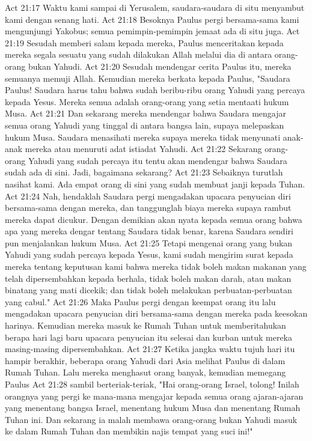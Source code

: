 Act 21:17  Waktu kami sampai di Yerusalem, saudara-saudara di situ menyambut kami dengan senang hati.
Act 21:18  Besoknya Paulus pergi bersama-sama kami mengunjungi Yakobus; semua pemimpin-pemimpin jemaat ada di situ juga.
Act 21:19  Sesudah memberi salam kepada mereka, Paulus menceritakan kepada mereka segala sesuatu yang sudah dilakukan Allah melalui dia di antara orang-orang bukan Yahudi.
Act 21:20  Sesudah mendengar cerita Paulus itu, mereka semuanya memuji Allah. Kemudian mereka berkata kepada Paulus, "Saudara Paulus! Saudara harus tahu bahwa sudah beribu-ribu orang Yahudi yang percaya kepada Yesus. Mereka semua adalah orang-orang yang setia mentaati hukum Musa.
Act 21:21  Dan sekarang mereka mendengar bahwa Saudara mengajar semua orang Yahudi yang tinggal di antara bangsa lain, supaya melepaskan hukum Musa. Saudara menasihati mereka supaya mereka tidak menyunati anak-anak mereka atau menuruti adat istiadat Yahudi.
Act 21:22  Sekarang orang-orang Yahudi yang sudah percaya itu tentu akan mendengar bahwa Saudara sudah ada di sini. Jadi, bagaimana sekarang?
Act 21:23  Sebaiknya turutlah nasihat kami. Ada empat orang di sini yang sudah membuat janji kepada Tuhan.
Act 21:24  Nah, hendaklah Saudara pergi mengadakan upacara penyucian diri bersama-sama dengan mereka, dan tanggunglah biaya mereka supaya rambut mereka dapat dicukur. Dengan demikian akan nyata kepada semua orang bahwa apa yang mereka dengar tentang Saudara tidak benar, karena Saudara sendiri pun menjalankan hukum Musa.
Act 21:25  Tetapi mengenai orang yang bukan Yahudi yang sudah percaya kepada Yesus, kami sudah mengirim surat kepada mereka tentang keputusan kami bahwa mereka tidak boleh makan makanan yang telah dipersembahkan kepada berhala, tidak boleh makan darah, atau makan binatang yang mati dicekik; dan tidak boleh melakukan perbuatan-perbuatan yang cabul."
Act 21:26  Maka Paulus pergi dengan keempat orang itu lalu mengadakan upacara penyucian diri bersama-sama dengan mereka pada keesokan harinya. Kemudian mereka masuk ke Rumah Tuhan untuk memberitahukan berapa hari lagi baru upacara penyucian itu selesai dan kurban untuk mereka masing-masing dipersembahkan.
Act 21:27  Ketika jangka waktu tujuh hari itu hampir berakhir, beberapa orang Yahudi dari Asia melihat Paulus di dalam Rumah Tuhan. Lalu mereka menghasut orang banyak, kemudian memegang Paulus
Act 21:28  sambil berteriak-teriak, "Hai orang-orang Israel, tolong! Inilah orangnya yang pergi ke mana-mana mengajar kepada semua orang ajaran-ajaran yang menentang bangsa Israel, menentang hukum Musa dan menentang Rumah Tuhan ini. Dan sekarang ia malah membawa orang-orang bukan Yahudi masuk ke dalam Rumah Tuhan dan membikin najis tempat yang suci ini!"
